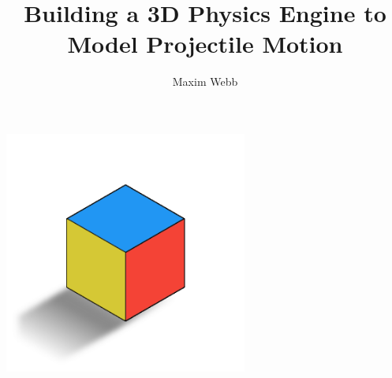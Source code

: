 \documentclass{report}
\title{
	\Huge
	{Building a 3D Physics Engine to Model Projectile Motion}\\
}
\author{Maxim Webb}
\begin{document}
\maketitle

{\includegraphics[width=0.6\textwidth]{title_image.png}}
\begin{figure}
\centering

\end{figure}
\newpage
\end{document}
